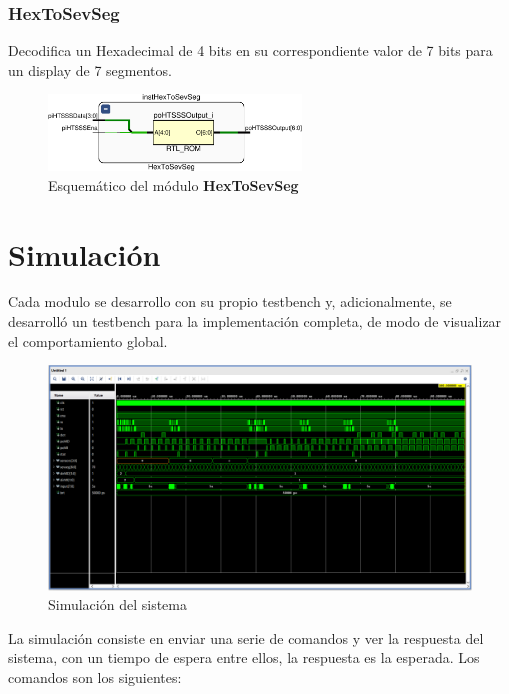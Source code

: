 \documentclass[12pt]{article}
\begin{document}
\subsubsection{HexToSevSeg}
Decodifica un Hexadecimal de 4 bits en su correspondiente valor de 7 bits para un display de 7 segmentos.
\begin{figure}[H]
    \centering
    \includegraphics[width=0.6\textwidth]{hex-to-sev-seg-crop}
    \caption{Esquemático del módulo \textbf{HexToSevSeg}}
\end{figure}

\section{Simulación}

Cada modulo se desarrollo con su propio testbench y, adicionalmente, se desarrolló un testbench para la implementación completa, de modo de visualizar el comportamiento global.

\begin{figure}[H]
    \centering
    \includegraphics[width=\textwidth]{sim1}
    \caption{Simulación del sistema}
\end{figure}

La simulación consiste en enviar una serie de comandos y ver la respuesta del sistema, con un tiempo de espera entre ellos, la respuesta es la esperada. Los comandos son los siguientes:
\end{document}
